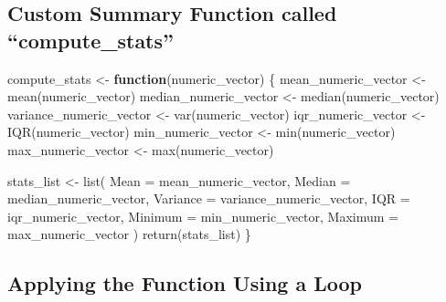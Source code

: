 \documentclass[
  letterpaper,
  DIV=11,
  numbers=noendperiod]{scrartcl}
\newenvironment{Shaded}{\begin{snugshade}}{\end{snugshade}}
\newcommand{\AttributeTok}[1]{\textcolor[rgb]{0.40,0.45,0.13}{#1}}
\newcommand{\ControlFlowTok}[1]{\textcolor[rgb]{0.00,0.23,0.31}{\textbf{#1}}}
\newcommand{\FunctionTok}[1]{\textcolor[rgb]{0.28,0.35,0.67}{#1}}
\newcommand{\NormalTok}[1]{\textcolor[rgb]{0.00,0.23,0.31}{#1}}
\newcommand{\OtherTok}[1]{\textcolor[rgb]{0.00,0.23,0.31}{#1}}
\begin{document}
\subsection{Custom Summary Function called
``compute\_stats''}\label{custom-summary-function-called-compute_stats}

\begin{Shaded}
\begin{Highlighting}[]
\NormalTok{compute\_stats }\OtherTok{\textless{}{-}} \ControlFlowTok{function}\NormalTok{(numeric\_vector) \{}
\NormalTok{  mean\_numeric\_vector }\OtherTok{\textless{}{-}} \FunctionTok{mean}\NormalTok{(numeric\_vector)}
\NormalTok{  median\_numeric\_vector }\OtherTok{\textless{}{-}} \FunctionTok{median}\NormalTok{(numeric\_vector)}
\NormalTok{  variance\_numeric\_vector }\OtherTok{\textless{}{-}} \FunctionTok{var}\NormalTok{(numeric\_vector)}
\NormalTok{  iqr\_numeric\_vector }\OtherTok{\textless{}{-}} \FunctionTok{IQR}\NormalTok{(numeric\_vector)}
\NormalTok{  min\_numeric\_vector }\OtherTok{\textless{}{-}} \FunctionTok{min}\NormalTok{(numeric\_vector)}
\NormalTok{  max\_numeric\_vector }\OtherTok{\textless{}{-}} \FunctionTok{max}\NormalTok{(numeric\_vector)}
  
\NormalTok{  stats\_list }\OtherTok{\textless{}{-}} \FunctionTok{list}\NormalTok{(}
    \AttributeTok{Mean =}\NormalTok{ mean\_numeric\_vector, }
    \AttributeTok{Median =}\NormalTok{ median\_numeric\_vector, }
    \AttributeTok{Variance =}\NormalTok{ variance\_numeric\_vector, }
    \AttributeTok{IQR =}\NormalTok{ iqr\_numeric\_vector, }
    \AttributeTok{Minimum =}\NormalTok{ min\_numeric\_vector, }
    \AttributeTok{Maximum =}\NormalTok{ max\_numeric\_vector}
\NormalTok{  )}
  \FunctionTok{return}\NormalTok{(stats\_list)}
\NormalTok{\}}
\end{Highlighting}
\end{Shaded}

\subsection{Applying the Function Using a
Loop}\label{applying-the-function-using-a-loop}
\end{document}
